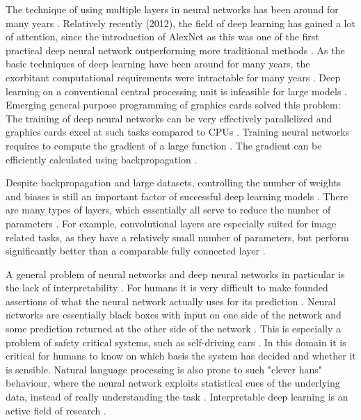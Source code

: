\documentclass[draft,final,oneside]{vutinfth} %
\begin{document}
The technique of using multiple layers in neural networks has been around for many years \cite{deeplearninginneuralnetworks}. Relatively recently (2012), the field of deep learning has gained a lot of attention, since the introduction of AlexNet \cite{alexnet} as this was one of the first practical deep neural network outperforming more traditional methods \cite{deeplearninginneuralnetworks}. As the basic techniques of deep learning have been around for many years, the exorbitant computational requirements were intractable for many years \cite{deeplearninginneuralnetworks}. Deep learning on a conventional central processing unit is infeasible for large models \cite{deeplearninginneuralnetworks}. Emerging general purpose programming of graphics cards solved this problem: The training of deep neural networks can be very effectively parallelized and graphics cards excel at such tasks compared to CPUs \cite{Goodfellow-et-al-2016}. Training neural networks requires to compute the gradient of a large function \cite{Goodfellow-et-al-2016}. The gradient can be efficiently calculated using backpropagation \cite{aimodern}. %

Despite backpropagation and large datasets, controlling the number of weights and biases is still an important factor of successful deep learning models \cite{deeplearninginneuralnetworks}. There are many types of layers, which essentially all serve to reduce the number of parameters \cite{Goodfellow-et-al-2016}. For example, convolutional layers are especially suited for image related tasks, as they have a relatively small number of parameters, but perform significantly better than a comparable fully connected layer \cite{deeplearninginneuralnetworks}.

A general problem of neural networks and deep neural networks in particular is the lack of interpretability \cite{interpretabledl}. For humans it is very difficult to make founded assertions of what the neural network actually uses for its prediction \cite{interpretabledl2}. Neural networks are essentially black boxes with input on one side of the network and some prediction returned at the other side of the network \cite{interpretabledl}. This is especially a problem of safety critical systems, such as self-driving cars \cite{selfdriving}. In this domain it is critical for humans to know on which basis the system has decided and whether it is sensible. Natural language processing is also prone to such "clever hans" behaviour, where the neural network exploits statistical cues of the underlying data, instead of really understanding the task \cite{cleverhans}. Interpretable deep learning is an active field of research \cite{interpretabledl}.
\end{document}
